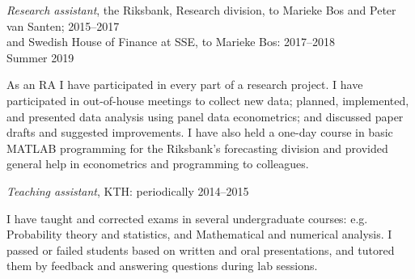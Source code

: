 \documentclass[a4paper,
10pt]{article}
\renewcommand{\year}[1]{\hfill#1\ignorespaces}
\newenvironment{lista}{\vspace*{-9pt}\begin{adjustwidth}{24pt}{0pt}}{\end{adjustwidth}\vspace*{-9pt}}
\newenvironment{lista2}{\vspace*{-12pt}\begin{adjustwidth}{24pt}{0pt}}{\end{adjustwidth}\vspace*{-12pt}}
\begin{document}
\emph{Research assistant}, the Riksbank, Research division, to Mar\-ieke Bos and Peter van Santen; \year{2015--2017}\\
and Swedish House of Finance at SSE, to Marieke Bos: \year{2017--2018}\\
\phantom{hej}  \year{Summer 2019}
\begin{lista}
As an RA I have participated in every part of a research project. I have participated in out-of-house meetings to collect new data; planned, implemented, and presented data analysis using panel data econometrics; and discussed paper drafts and suggested improvements. I have also held a one-day course in basic MATLAB programming for the Riksbank's forecasting division and provided general help in econometrics and programming to colleagues.\\
\end{lista}
\iffalse
\begin{lista}
I have also worked with: Bo Becker, Itzhak Ben-David, Emily Breza, Chlo\'e Le Coq, Andres Liberman, Kurt Mitman, Leonard Nakamura, Stan Rabinovich, Kasper Roszbach, David Vestin.
\end{lista}
\fi

\emph{Teaching assistant}, KTH: \year{periodically 2014--2015}
\begin{lista2}
I have taught and corrected exams in several undergraduate courses: e.g. Probability theory and statistics, and Mathematical and numerical analysis. I passed or failed students based on written and oral presentations, and tutored them by feedback and answering questions during lab sessions. %
\end{lista2}

\end{document}
